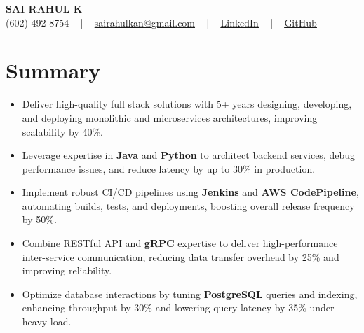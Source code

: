 \documentclass[letterpaper,11pt]{article}
\newcommand{\resumeItem}[1]{
  \item\footnotesize{
    {#1 \vspace{-2pt}}
  }
}
\newcommand{\resumeItemListStart}{\begin{itemize}[leftmargin=*]}
\newcommand{\resumeItemListEnd}{\end{itemize}\vspace{-5pt}}
\begin{document}
\begin{center}
    {\fontsize{14pt}{12pt}\selectfont \textbf{\MakeUppercase{Sai Rahul K}}}\\ \vspace{2pt}
    \fontsize{10pt}{12pt}\selectfont (602) 492-8754 ~ | ~ \href{mailto:sairahulkan@gmail.com}{sairahulkan@gmail.com} ~ | ~
    \href{https://www.linkedin.com/in/rq123/}{\color{blue}\underline{LinkedIn}} ~ | ~
    \href{https://github.com/kanrahuldo}{\color{blue}\underline{GitHub}}~
    \vspace{-8pt}
\end{center}

\section{Summary}
\fontsize{9pt}{10pt}\selectfont
\resumeItemListStart
    \resumeItem{Deliver high-quality full stack solutions with 5+ years designing, developing, and deploying monolithic and microservices architectures, improving scalability by 40\%.}
    \resumeItem{Leverage expertise in \textbf{Java} and \textbf{Python} to architect backend services, debug performance issues, and reduce latency by up to 30\% in production.}
    \resumeItem{Implement robust CI/CD pipelines using \textbf{Jenkins} and \textbf{AWS CodePipeline}, automating builds, tests, and deployments, boosting overall release frequency by 50\%.}
    \resumeItem{Combine RESTful API and \textbf{gRPC} expertise to deliver high-performance inter-service communication, reducing data transfer overhead by 25\% and improving reliability.}
    \resumeItem{Optimize database interactions by tuning \textbf{PostgreSQL} queries and indexing, enhancing throughput by 30\% and lowering query latency by 35\% under heavy load.}
\resumeItemListEnd
\vspace{-6pt}
\end{document}

